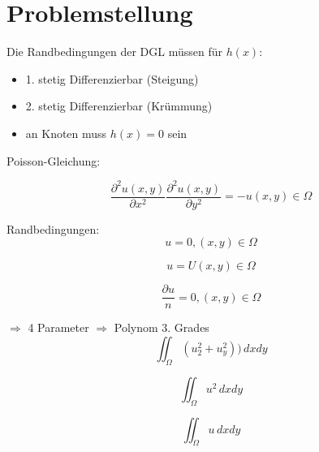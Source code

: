 %
%
%
\section{Problemstellung
\label{fem:section:problemstellung}}

Die Randbedingungen der DGL müssen für  $h(x)$:

\begin{itemize}
	\item 1. stetig Differenzierbar (Steigung)
	\item 2. stetig Differenzierbar (Krümmung)
	\item an Knoten muss $h(x) = 0$ sein
\end{itemize}

Poisson-Gleichung:

\begin{equation}
\frac{\partial^2 u(x,y)}{\partial x^2} \frac{\partial^2 u(x,y)}{\partial y^2} = - u(x,y)  \in \Omega
\label{fem:equation5}
\end{equation}

Randbedingungen:
\begin{equation}
u = 0, (x,y)\in \Omega
\label{fem:rand1}
\end{equation}

\begin{equation}
u = U (x,y)\in \Omega
\label{fem:rand2}
\end{equation}

\begin{equation}
\frac{\partial u}{n} = 0, (x,y)\in \Omega
\label{fem:rand3}
\end{equation}
 
$\Rightarrow$ 4 Parameter $\Rightarrow$ Polynom 3. Grades\\



\begin{equation}
\iint_{\!\!\!\!\!\!\!\Omega} \limits (u_2^2 + u_y^2)) \,dx dy
\label{fem:equation1}
\end{equation}

\begin{equation}
\iint_{\!\!\!\!\!\!\!\Omega} \limits u^2  \,dx dy
\label{fem:equation2}
\end{equation}

\begin{equation}
\iint_{\!\!\!\!\!\!\!\Omega} \limits u  \,dx dy
\label{fem:equation3}
\end{equation}



